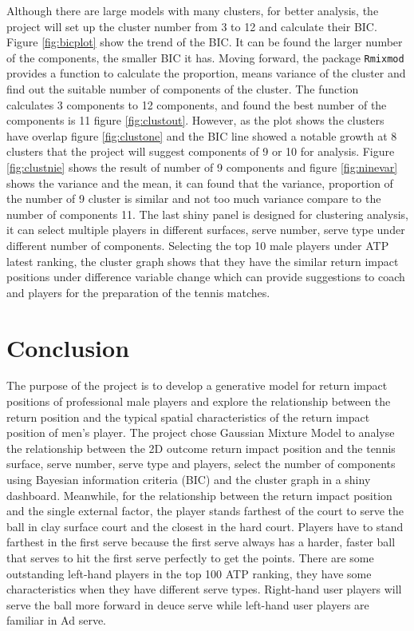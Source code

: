 \documentclass[11pt,a4paper,]{article}
\begin{document}
Although there are large models with many clusters, for better analysis, the project will set up the cluster number from 3 to 12 and calculate their BIC.
Figure \ref{fig:bicplot} show the trend of the BIC. It can be found the larger number of the components, the smaller BIC it has.
Moving forward, the package \texttt{Rmixmod} provides a function to calculate the proportion, means variance of the cluster and find out the suitable number of components of the cluster. The function calculates 3 components to 12 components, and found the best number of the components is 11 figure \ref{fig:clustout}. However, as the plot shows the clusters have overlap figure \ref{fig:clustone} and the BIC line showed a notable growth at 8 clusters that the project will suggest components of 9 or 10 for analysis.
Figure \ref{fig:clustnie} shows the result of number of 9 components and figure \ref{fig:ninevar} shows the variance and the mean, it can found that the variance, proportion of the number of 9 cluster is similar and not too much variance compare to the number of components 11.
The last shiny panel is designed for clustering analysis, it can select multiple players in different surfaces, serve number, serve type under different number of components. Selecting the top 10 male players under ATP latest ranking, the cluster graph shows that they have the similar return impact positions under difference variable change which can provide suggestions to coach and players for the preparation of the tennis matches.

\hypertarget{conclusion}{%
\section{Conclusion}\label{conclusion}}

The purpose of the project is to develop a generative model for return impact positions of professional male players and explore the relationship between the return position and the typical spatial characteristics of the return impact position of men's player. The project chose Gaussian Mixture Model to analyse the relationship between the 2D outcome return impact position and the tennis surface, serve number, serve type and players, select the number of components using Bayesian information criteria (BIC) and the cluster graph in a shiny dashboard. Meanwhile, for the relationship between the return impact position and the single external factor, the player stands farthest of the court to serve the ball in clay surface court and the closest in the hard court. Players have to stand farthest in the first serve because the first serve always has a harder, faster ball that serves to hit the first serve perfectly to get the points. There are some outstanding left-hand players in the top 100 ATP ranking, they have some characteristics when they have different serve types. Right-hand user players will serve the ball more forward in deuce serve while left-hand user players are familiar in Ad serve.
\end{document}
